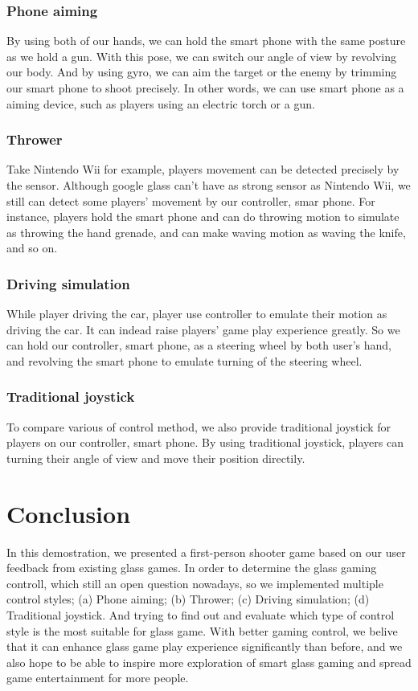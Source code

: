 \documentclass{sigchi}
\begin{document}
\subsubsection{Phone aiming}
By using both of our hands, we can hold the smart phone with the same posture as we hold a gun. With this pose, we can switch our angle of view by revolving our body. And by using gyro, we can aim the target or the enemy by trimming our smart phone to shoot precisely. In other words, we can use smart phone as a aiming device, such as players using an electric torch or a gun.

\subsubsection{Thrower}
Take Nintendo Wii for example, players movement can be detected precisely by the sensor. Although google glass can't have as strong sensor as Nintendo Wii, we still can detect some players' movement by our controller, smar phone. For instance, players hold the smart phone and can do throwing motion to simulate as throwing the hand grenade, and can make waving motion as waving the knife, and so on.

\subsubsection{Driving simulation}
While player driving the car, player use controller to emulate their motion as driving the car. It can indead raise players' game play experience greatly. So we can hold our controller, smart phone, as a steering wheel by both user's hand, and revolving the smart phone to emulate turning of the steering wheel.

\subsubsection{Traditional joystick}
To compare various of control method, we also provide traditional joystick for players on our controller, smart phone. By using traditional joystick, players can turning their angle of view and move their position directily.

\section{Conclusion}
In this demostration, we presented a first-person shooter game based on our user feedback from existing glass games. In order to determine the glass gaming controll, which still an open question nowadays, so we implemented multiple control styles; (a) Phone aiming; (b) Thrower; (c) Driving simulation; (d) Traditional joystick. And trying to find out and evaluate which type of control style is the most suitable for glass game. With better gaming control, we belive that it can enhance glass game play experience significantly than before, and we also hope to be able to inspire more exploration of smart glass gaming and spread game entertainment for more people.
\end{document}
